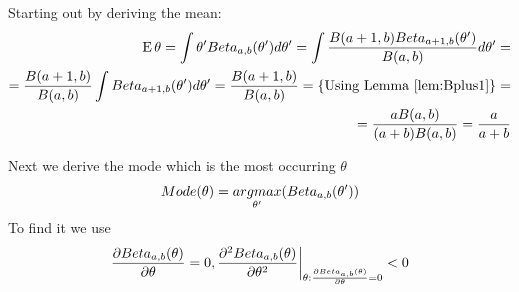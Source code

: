 \documentclass[a4paper,twoside=false,abstract=false,numbers=noenddot,
titlepage=false,headings=small,parskip=half,version=last]{scrartcl}
\begin{document}
\begin{solution}
    Starting out by deriving the mean: 
    \begin{equation}
        \begin{split}
            {\rm E}\,\theta = \int\theta'Beta_{a,b}(\theta')d\theta' =
            \int\frac{B(a+1,b)Beta_{a+1,b}(\theta')}{B(a,b)}d\theta' = \\
            = \frac{B(a+1,b)}{B(a,b)}\int{Beta_{a+1,b}(\theta')d\theta'} =
            \frac{B(a+1,b)}{B(a,b)} = \{\text{Using Lemma \ref{lem:Bplus1}}\}=\\
            =\frac{aB(a,b)}{(a+b)B(a,b)}=\frac{a}{a+b}
        \end{split}
    \end{equation}
    
    Next we derive the mode which is the most occurring $\theta$
    \begin{equation}
        Mode(\theta)=\underset{\theta'}{argmax}(Beta_{a,b}(\theta'))
    \end{equation}
    To find it we use
    \begin{equation}
        \frac{\partial{Beta_{a,b}(\theta)}}{\partial{\theta}}=0,
        {
            \frac{\partial^2{
                Beta_{a,b}(\theta)
            }}{\partial{
                \theta
            }^2}
        }\bigg|_{
            \theta:\frac{\partial{
                Beta_{a,b}(\theta)
            }}{\partial{
                \theta
            }}=0
        }
        <0
    \end{equation}


\end{solution}
\end{document}
